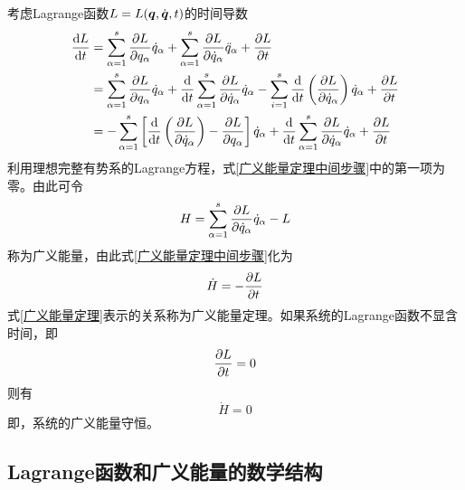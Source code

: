 考虑Lagrange函数$L = L(\boldsymbol{q},\dot{\boldsymbol{q}},t)$的时间导数
\begin{align}
	\frac{\mathrm{d} L}{\mathrm{d} t} & = \sum_{\alpha=1}^s \frac{\partial L}{\partial q_\alpha}\dot{q}_\alpha + \sum_{\alpha=1}^s \frac{\partial L}{\partial \dot{q}_\alpha} \ddot{q}_\alpha + \frac{\partial L}{\partial t} \nonumber \\ 
	& = \sum_{\alpha=1}^s \frac{\partial L}{\partial q_\alpha} \dot{q}_\alpha + \frac{\mathrm{d}}{\mathrm{d} t} \sum_{\alpha=1}^s \frac{\partial L}{\partial \dot{q}_\alpha} \dot{q}_\alpha - \sum_{i=1}^s \frac{\mathrm{d}}{\mathrm{d} t} \left(\frac{\partial L}{\partial \dot{q}_\alpha}\right) \dot{q}_\alpha + \frac{\partial L}{\partial t} \nonumber \\
	& = -\sum_{\alpha=1}^s \left[\frac{\mathrm{d}}{\mathrm{d} t} \left(\frac{\partial L}{\partial \dot{q}_\alpha}\right) - \frac{\partial L}{\partial q_\alpha}\right] \dot{q}_\alpha + \frac{\mathrm{d}}{\mathrm{d} t} \sum_{\alpha=1}^s \frac{\partial L}{\partial \dot{q}_\alpha} \dot{q}_\alpha + \frac{\partial L}{\partial t}
	\label{广义能量定理中间步骤}
\end{align}
利用理想完整有势系的Lagrange方程，式\eqref{广义能量定理中间步骤}中的第一项为零。由此可令
\begin{equation}
	H = \sum_{\alpha=1}^s \frac{\partial L}{\partial \dot{q}_\alpha} \dot{q}_\alpha - L
	\label{广义能量}
\end{equation}
称为{\heiti 广义能量}，由此式\eqref{广义能量定理中间步骤}化为
\begin{equation}
	\dot{H} = -\frac{\partial L}{\partial t}
	\label{广义能量定理}
\end{equation}
式\eqref{广义能量定理}表示的关系称为{\heiti 广义能量定理}。如果系统的Lagrange函数不显含时间，即
\begin{equation*}
	\frac{\partial L}{\partial t} = 0
\end{equation*}
则有
\begin{equation}
	\dot{H} = 0
\end{equation}
即，系统的广义能量守恒。

\subsection{Lagrange函数和广义能量的数学结构}\label{第二章：广义能量的数学结构}


